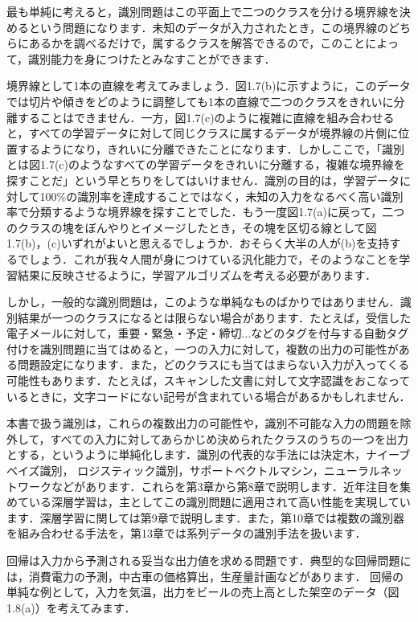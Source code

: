 最も単純に考えると，識別問題はこの平面上で二つのクラスを分ける境界線を決めるという問題になります．未知のデータが入力されたとき，この境界線のどちらにあるかを調べるだけで，属するクラスを解答できるので，このことによって，識別能力を身につけたとみなすことができます．

境界線として1本の直線を考えてみましょう．図1.7(b)に示すように，このデータでは切片や傾きをどのように調整しても1本の直線で二つのクラスをきれいに分離することはできません．一方，図1.7(c)のように複雑に直線を組み合わせると，すべての学習データに対して同じクラスに属するデータが境界線の片側に位置するようになり，きれいに分離できたことになります．しかしここで，「識別とは図1.7(c)のようなすべての学習データをきれいに分離する，複雑な境界線を探すことだ」という早とちりをしてはいけません．識別の目的は，学習データに対して100\%の識別率を達成することではなく，未知の入力をなるべく高い識別率で分類するような境界線を探すことでした．もう一度図1.7(a)に戻って，二つのクラスの塊をぼんやりとイメージしたとき，その塊を区切る線として図1.7(b)，(c)いずれがよいと思えるでしょうか．おそらく大半の人が(b)を支持するでしょう．これが我々人間が身につけている汎化能力で，そのようなことを学習結果に反映させるように，学習アルゴリズムを考える必要があります．

しかし，一般的な識別問題は，このような単純なものばかりではありません．識別結果が一つのクラスになるとは限らない場合があります．たとえば，受信した電子メールに対して，重要・緊急・予定・締切...などのタグを付与する自動タグ付けを識別問題に当てはめると，一つの入力に対して，複数の出力の可能性がある問題設定になります．また，どのクラスにも当てはまらない入力が入ってくる可能性もあります．たとえば，スキャンした文書に対して文字認識をおこなっているときに，文字コードにない記号が含まれている場合があるかもしれません．

本書で扱う識別は，これらの複数出力の可能性や，識別不可能な入力の問題を除外して，すべての入力に対してあらかじめ決められたクラスのうちの一つを出力とする，というように単純化します．識別の代表的な手法には決定木，ナイーブベイズ識別， ロジスティック識別，サポートベクトルマシン，ニューラルネットワークなどがあります．これらを第3章から第8章で説明します．近年注目を集めている深層学習は，主としてこの識別問題に適用されて高い性能を実現しています．深層学習に関しては第9章で説明します．また，第10章では複数の識別器を組み合わせる手法を，第13章では系列データの識別手法を扱います．


回帰は入力から予測される妥当な出力値を求める問題です．典型的な回帰問題には，消費電力の予測，中古車の価格算出，生産量計画などがあります．
回帰の単純な例として，入力を気温，出力をビールの売上高とした架空のデータ（図1.8(a)）を考えてみます．

